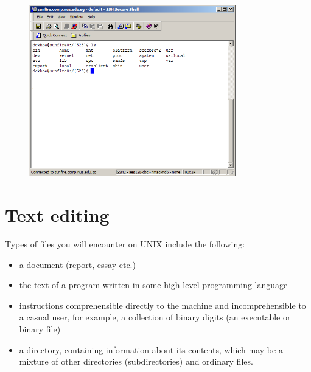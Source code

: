 \begin{frame}
\begin{figure}
\begin{center}
\includegraphics[width=0.8\textwidth]{ssh_command_line}
\end{center}
\end{figure}

\end{frame}



\section{Text editing} %

Types of files you will encounter on UNIX include the following:
\begin{itemize}
\item a document (report, essay etc.)
\item the text of a program written in some high-level programming language
\item instructions comprehensible directly to the machine and incomprehensible 
to a casual user, for example, a collection of binary digits (an executable or 
binary file)
\item a directory, containing information about its contents, which may be a 
mixture of other directories (subdirectories) and ordinary files.
\end{itemize}

